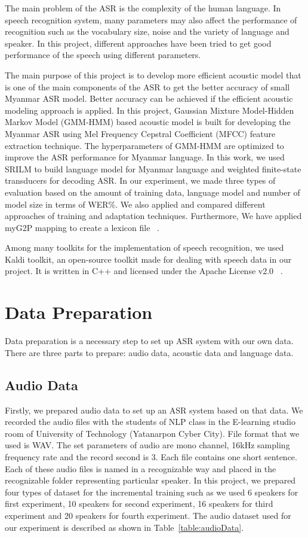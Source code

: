 \documentclass[conference]{IEEEtran}
\begin{document}
The main problem of the ASR is the complexity of the human language. In speech recognition system, many parameters may also affect the performance of recognition such as the vocabulary size, noise and the variety of language and speaker. In this project, different approaches have been tried to get good performance of the speech using different parameters.

The main purpose of this project is to develop more efficient acoustic model that is one of the main components of the ASR to get the better accuracy of small Myanmar ASR model. Better accuracy can be achieved if the efficient acoustic modeling approach is applied. In this project, Gaussian Mixture Model-Hidden Markov Model (GMM-HMM) based acoustic model is built for developing the Myanmar ASR using Mel Frequency Cepstral Coefficient (MFCC) feature extraction technique. The hyperparameters of GMM-HMM are optimized to improve the ASR performance for Myanmar language. In this work, we used SRILM to build language model for Myanmar language and weighted finite-state transducers for decoding ASR. In our experiment, we made three types of evaluation based on the amount of training data, language model and number of model size in terms of WER\%. We also applied and compared different approaches of training and adaptation techniques. Furthermore, We have applied myG2P mapping to create a lexicon file ~\cite{YKTG2P}.

Among many toolkits for the implementation of speech recognition, we used Kaldi toolkit, an open-source toolkit made for dealing with speech data in our project. It is written in C++ and licensed under the Apache License v2.0 ~\cite{howtostartKaldi}. 

\section{Data Preparation}
\label{sec:DataPreparation}
Data preparation is a necessary step to set up ASR system with our own data. There are three parts to prepare: audio data, acoustic data and language data. 

\subsection {Audio Data}
\label{subsec:AudioData}
Firstly, we prepared audio data to set up an ASR system based on that data. We recorded the audio files with the students of NLP class in the E-learning studio room of University of Technology (Yatanarpon Cyber City). File format that we used is WAV. The set parameters of audio are mono channel, 16kHz sampling frequency rate and the record second is 3. Each file contains one short sentence. Each of these audio files is named in a recognizable way and placed in the recognizable folder representing particular speaker. 
In this project, we prepared four types of dataset for the incremental training such as we used 6 speakers for first experiment, 10 speakers for second experiment, 16 speakers for third experiment and 20 speakers for fourth experiment. The audio dataset used for our experiment is described as shown in Table~\ref{table:audioData}.
\end{document}
